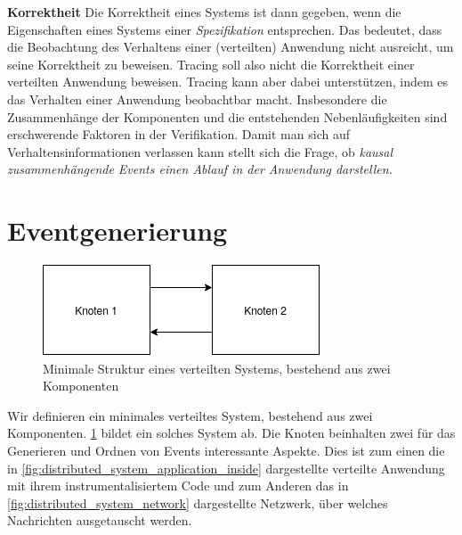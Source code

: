 \textbf{Korrektheit} \space\space\space Die Korrektheit eines Systems ist dann gegeben, wenn die Eigenschaften eines Systems einer \emph{Spezifikation} entsprechen. Das bedeutet, dass die Beobachtung des Verhaltens einer (verteilten) Anwendung nicht ausreicht, um seine Korrektheit zu beweisen. Tracing soll also nicht die Korrektheit einer verteilten Anwendung beweisen. Tracing kann aber dabei unterstützen, indem es das Verhalten einer Anwendung beobachtbar macht. Insbesondere die Zusammenhänge der Komponenten und die entstehenden Nebenläufigkeiten sind erschwerende Faktoren in der Verifikation. Damit man sich  auf Verhaltensinformationen verlassen kann stellt sich die Frage, ob \emph{kausal zusammenhängende Events einen Ablauf in der Anwendung darstellen.}

\section{Eventgenerierung}
\label{section:Eventgenerierung}


\begin{figure}[!ht]
	\centering
	\includegraphics[scale=0.5]{img/Problembeschreibung/distributed_system_application_minimal.png}
	\caption[Minimale Struktur eines verteilten Systems]{Minimale Struktur eines verteilten Systems, bestehend aus zwei Komponenten}
	\label{fig:distributed_system_application_minimal}
\end{figure}

Wir definieren ein minimales verteiltes System, bestehend aus zwei Komponenten. \cref{fig:distributed_system_application_minimal} bildet ein solches System ab. Die Knoten beinhalten zwei für das Generieren und Ordnen von Events interessante Aspekte. Dies ist zum einen die in \cref{fig:distributed_system_application_inside} dargestellte verteilte Anwendung mit ihrem instrumentalisiertem Code und zum Anderen das in \cref{fig:distributed_system_network} dargestellte Netzwerk, über welches Nachrichten ausgetauscht werden. 

